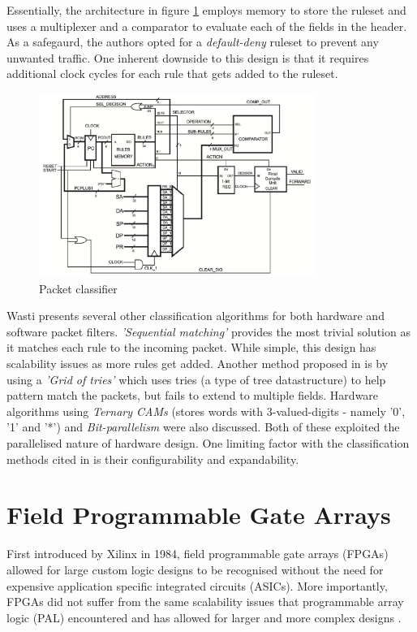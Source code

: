 Essentially, the architecture in figure \ref{fig:fast-fpga-classifier} employs memory to store the ruleset and uses a multiplexer and a comparator to evaluate each of the fields in the header. As a safegaurd, the authors opted for a \textit{default-deny} ruleset to prevent any unwanted traffic. One inherent downside to this design is that it requires additional clock cycles for each rule that gets added to the ruleset. 


\begin{figure}[h]
    \centering
    \includegraphics[width=0.8\textwidth]{Images/packetFilterHardware.png}
    \caption[Packet classifier]{Packet classifier \cite{FastRecongifFPGAFirewall}}
    \label{fig:fast-fpga-classifier}
\end{figure}


Wasti \cite{Wasti2001HardwareAP} presents several other classification algorithms for both hardware and software packet filters. \textit{'Sequential matching'} provides the most trivial solution as it matches each rule to the incoming packet. While simple, this design has scalability issues as more rules get added. Another method proposed in \cite{Wasti2001HardwareAP} is by using a \textit{'Grid of tries'} which uses tries (a type of tree datastructure) to help pattern match the packets, but fails to extend to multiple fields. 
Hardware algorithms using \textit{Ternary CAMs} (stores words with 3-valued-digits - namely '0', '1' and '*') and \textit{Bit-parallelism} were also discussed. Both of these exploited the parallelised nature of hardware design. One limiting factor with the classification methods cited in \cite{Wasti2001HardwareAP} is their configurability and expandability. 








\section{Field Programmable Gate Arrays}
\label{subsection:fpga}	
First introduced by Xilinx in 1984, field programmable gate arrays (FPGAs) allowed for large custom logic designs to be recognised without the need for 
expensive application specific integrated circuits (ASICs). More importantly, FPGAs did not suffer from the same scalability issues that
programmable array logic (PAL) encountered and has allowed for larger and more complex designs \cite{30YearsOfFPGA}. 

